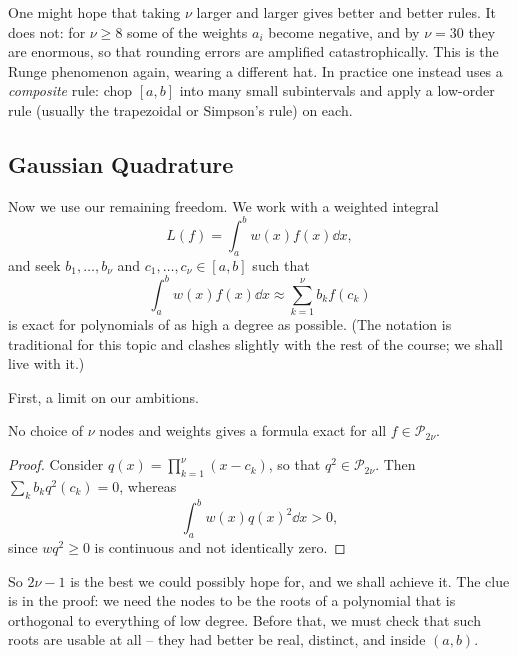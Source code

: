 \documentclass[a4paper]{scrartcl}
\newcommand{\Pn}[1]{\mathcal{P}_{#1}}
\begin{document}
\begin{remark}
  One might hope that taking $\nu$ larger and larger gives better and better rules. It does not: for $\nu \geq 8$ some of the weights $a_i$ become negative, and by $\nu = 30$ they are enormous, so that rounding errors are amplified catastrophically. This is the Runge phenomenon again, wearing a different hat. In practice one instead uses a \emph{composite} rule: chop $[a,b]$ into many small subintervals and apply a low-order rule (usually the trapezoidal or Simpson's rule) on each.
\end{remark}

\subsection{Gaussian Quadrature}

Now we use our remaining freedom. We work with a weighted integral
$$
L(f) = \int_a^b w(x)f(x)\dd x,
$$
and seek  $b_1, \dots, b_\nu$ and  $c_1, \dots, c_\nu \in [a,b]$ such that
$$
\int_a^b w(x)f(x)\dd x \approx \sum_{k=1}^{\nu}b_k f(c_k)
$$
is exact for polynomials of as high a degree as possible. (The notation is traditional for this topic and clashes slightly with the rest of the course; we shall live with it.)

First, a limit on our ambitions.

\begin{proposition}\label{prop:gaussmax}
  No choice of $\nu$ nodes and weights gives a formula exact for all $f \in \Pn{2\nu}$.
\end{proposition}
\begin{proof}
  Consider $q(x) = \prod_{k=1}^\nu (x - c_k)$, so that $q^2 \in \Pn{2\nu}$. Then $\sum_k b_k q^2(c_k) = 0$, whereas
  $$
  \int_a^b w(x)q(x)^2\dd x > 0,
  $$
  since $wq^2 \geq 0$ is continuous and not identically zero.
\end{proof}

So $2\nu - 1$ is the best we could possibly hope for, and we shall achieve it. The clue is in the proof: we need the nodes to be the roots of a polynomial that is orthogonal to everything of low degree. Before that, we must check that such roots are usable at all -- they had better be real, distinct, and inside $(a,b)$.
\end{document}
